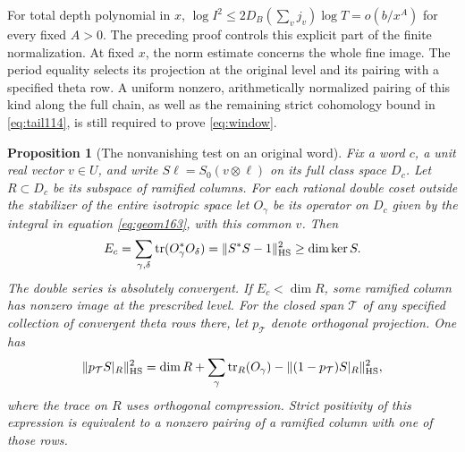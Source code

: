 \documentclass[a4paper,11pt]{article}
\newtheorem{proposition}{Proposition}[section]
\theoremstyle{definition}
\theoremstyle{remark}
\numberwithin{equation}{section}
\begin{document}
For total depth polynomial in \(x\),
\(\log I^2\le2D_B(\sum_v j_v)\log T=o(b/x^A)\) for every fixed
\(A>0\). The preceding proof controls this explicit part of the
finite normalization. At fixed \(x\), the norm estimate concerns
the whole fine image. The period equality selects its projection
at the original level and its pairing with a specified theta
row. A uniform nonzero, arithmetically normalized pairing of
this kind along the full chain, as well as the remaining
strict cohomology bound in \eqref{eq:tail114}, is still required
to prove \eqref{eq:window}.

\begin{proposition}[The nonvanishing test on an original word]
\label{prop:word166}
Fix a word \(c\), a unit real vector \(v\in U\), and write
\(S\ell=S_0(v\otimes\ell)\) on its full class space \(D_c\).
Let \(R\subset D_c\) be its subspace of ramified columns.
For each rational double coset outside the stabilizer of the
entire isotropic space let
\(O_\gamma\) be its operator on \(D_c\) given by the integral
in equation \ref{eq:geom163}, with this common \(v\). Then
\[
 E_c=\sum_{\gamma,\delta}
       \operatorname{tr}(O_\gamma^*O_\delta)
       =\|S^*S-1\|_{\rm HS}^2\ge\dim\ker S .
\]
The double series is absolutely convergent. If
\(E_c<\dim R\), some ramified column has nonzero image at
the prescribed level. For the closed span \(\mathcal T\) of
any specified collection of convergent theta rows there,
let \(p_{\mathcal T}\) denote orthogonal projection. One has
\[
 \|p_{\mathcal T} S|_R\|_{\rm HS}^2
  =\dim R+\sum_\gamma\operatorname{tr}_R(O_\gamma)
                   -\|(1-p_{\mathcal T})S|_R\|_{\rm HS}^2 ,
\]
where the trace on \(R\) uses orthogonal compression.
Strict positivity of this expression is equivalent to a
nonzero pairing of a ramified column with one of those rows.
\end{proposition}
\end{document}

